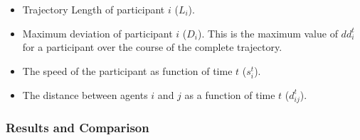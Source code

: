 \begin{itemize}
    \item Trajectory Length of participant $i$ ($L_i$).
    \item Maximum deviation of participant $i$ ($D_i$). This is the maximum value of $dd^t_i$ for a participant over the course of the complete trajectory.
    \item The speed of the participant as function of time $t$ ($s^t_i$).
    \item The distance between agents $i$ and $j$ as a function of time $t$ ($d^t_{ij}$).
\end{itemize}



\subsubsection{Results and Comparison} %
\label{sec:comparison_of_ibp}

